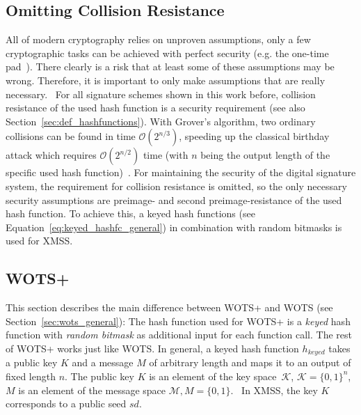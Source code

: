 \subsection{Omitting Collision Resistance}
All of modern cryptography relies on unproven assumptions, only a few cryptographic tasks can be achieved with perfect security (e.g. the one-time pad~\cite{one_time_pad_2013}). There clearly is a risk that at least some of these assumptions may be wrong. Therefore, it is important to only make assumptions that are really necessary.~\cite{minimal_security_assump_phd_2016}
For all signature schemes shown in this work before, collision resistance of the used hash function is a security requirement (see also Section~\ref{sec:def_hashfunctions}). 
With Grover’s algorithm, two ordinary collisions can be found in time $\mathcal{O}(2^{n/3})$, speeding up the classical birthday attack which requires $\mathcal{O}(2^{n/2})$ time (with $n$ being the output length of the specific used hash function)~\cite{colission_complexity_reduction_quantum_2019, birthday_attack_quantum_collision_1998}. %
For maintaining the security of the digital signature system, the requirement for collision resistance is omitted, so the only necessary security assumptions are preimage- and second preimage-resistance of the used hash function.
To achieve this, a keyed hash functions (see Equation~\ref{eq:keyed_hashfc_general}) in combination with random bitmasks is used for XMSS. %


\subsection{WOTS+}
\label{sec:wots+_general}
This section describes the main difference between WOTS+ and WOTS (see Section~\ref{sec:wots_general}): The hash function used for WOTS+ is a \textit{keyed} hash function with \textit{random bitmask} as additional input for each function call. The rest of WOTS+ works just like WOTS.
In general, a keyed hash function $h_{keyed}$ takes a public key $K$ and a message $M$ of arbitrary length and maps it to an output of fixed length $n$. The public key $K$ is an element of the key space~$\mathcal{K}$, $\mathcal{K}=\{0,1\}^n$, $M$ is an element of the message space $\mathcal{M}, M=\{0,1\}$.~\cite{keyed_hashfct_introduct_2006} In XMSS, the key $K$ corresponds to a public seed $sd$. 

